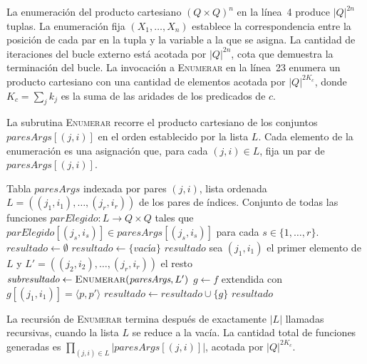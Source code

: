 \documentclass[11pt, letterpaper]{article}
\theoremstyle{definition}
\begin{document}
La enumeración del producto cartesiano $(Q \times Q)^n$ en la línea~4 produce $|Q|^{2n}$ tuplas. La enumeración fija $(X_1, \dots, X_n)$ establece la correspondencia entre la posición de cada par en la tupla y la variable a la que se asigna. La cantidad de iteraciones del bucle externo está acotada por $|Q|^{2n}$, cota que demuestra la terminación del bucle. La invocación a \textsc{Enumerar} en la línea~23 enumera un producto cartesiano con una cantidad de elementos acotada por $|Q|^{2 K_c}$, donde $K_c = \sum_j k_j$ es la suma de las aridades de los predicados de $c$.

La subrutina \textsc{Enumerar} recorre el producto cartesiano de los conjuntos $\textit{paresArgs}[(j, i)]$ en el orden establecido por la lista $L$. Cada elemento de la enumeración es una asignación que, para cada $(j, i) \in L$, fija un par de $\textit{paresArgs}[(j, i)]$.

\begin{algorithm}[H]
\caption{\textsc{Enumerar}($\textit{paresArgs}, L$)}
\begin{algorithmic}[1]
\Require Tabla $\textit{paresArgs}$ indexada por pares $(j, i)$, lista ordenada $L = ((j_1, i_1), \dots, (j_r, i_r))$ de los pares de índices.
\Ensure  Conjunto de todas las funciones $\textit{parElegido} : L \to Q \times Q$ tales que $\textit{parElegido}[(j_s, i_s)] \in \textit{paresArgs}[(j_s, i_s)]$ para cada $s \in \{1, \dots, r\}$.
\State $\textit{resultado} \gets \emptyset$
    \State $\textit{resultado} \gets \{\textit{vacía}\}$
    \State \Return $\textit{resultado}$
\EndIf
\State sea $(j_1, i_1)$ el primer elemento de $L$ y $L' = ((j_2, i_2), \dots, (j_r, i_r))$ el resto
\State $\textit{subresultado} \gets \textsc{Enumerar}(\textit{paresArgs}, L')$
        \State $g \gets f$ extendida con $g[(j_1, i_1)] = \langle p, p' \rangle$
        \State $\textit{resultado} \gets \textit{resultado} \cup \{g\}$
    \EndFor
\EndFor
\State \Return $\textit{resultado}$
\end{algorithmic}
\end{algorithm}

La recursión de \textsc{Enumerar} termina después de exactamente $|L|$ llamadas recursivas, cuando la lista $L$ se reduce a la vacía. La cantidad total de funciones generadas es $\prod_{(j,i) \in L} |\textit{paresArgs}[(j, i)]|$, acotada por $|Q|^{2 K_c}$.
\end{document}
